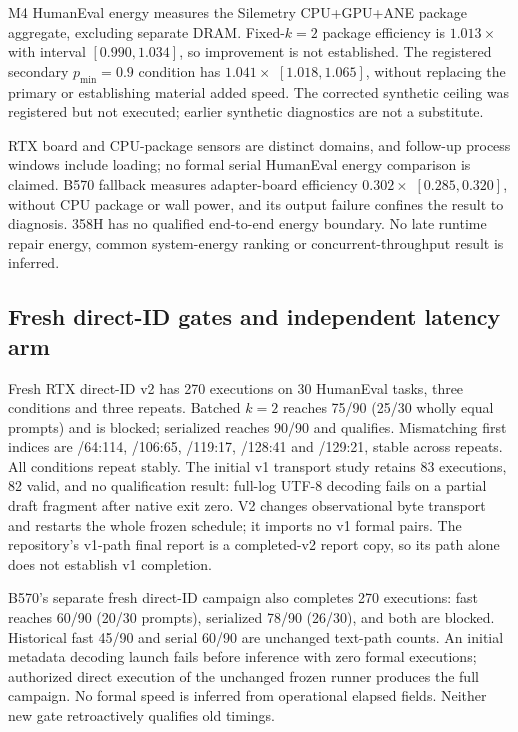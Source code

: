 M4 HumanEval energy measures the Silemetry CPU+GPU+ANE package aggregate, excluding separate DRAM. Fixed-$k=2$ package efficiency is $1.013\times$ with interval $[0.990,1.034]$, so improvement is not established. The registered secondary $p_{\min}=0.9$ condition has $1.041\times$ $[1.018,1.065]$, without replacing the primary or establishing material added speed. The corrected synthetic ceiling was registered but not executed; earlier synthetic diagnostics are not a substitute.

RTX board and CPU-package sensors are distinct domains, and follow-up process windows include loading; no formal serial HumanEval energy comparison is claimed. B570 fallback measures adapter-board efficiency $0.302\times$ $[0.285,0.320]$, without CPU package or wall power, and its output failure confines the result to diagnosis. 358H has no qualified end-to-end energy boundary. No late runtime repair energy, common system-energy ranking or concurrent-throughput result is inferred.

\subsection{Fresh direct-ID gates and independent latency arm}
\label{supp:historical_id_gates}
Fresh RTX direct-ID v2 has 270 executions on 30 HumanEval tasks, three conditions and three repeats. Batched $k=2$ reaches 75/90 (25/30 wholly equal prompts) and is blocked; serialized reaches 90/90 and qualifies. Mismatching first indices are /64:114, /106:65, /119:17, /128:41 and /129:21, stable across repeats. All conditions repeat stably. The initial v1 transport study retains 83 executions, 82 valid, and no qualification result: full-log UTF-8 decoding fails on a partial draft fragment after native exit zero. V2 changes observational byte transport and restarts the whole frozen schedule; it imports no v1 formal pairs. The repository's v1-path final report is a completed-v2 report copy, so its path alone does not establish v1 completion.

B570's separate fresh direct-ID campaign also completes 270 executions: fast reaches 60/90 (20/30 prompts), serialized 78/90 (26/30), and both are blocked. Historical fast 45/90 and serial 60/90 are unchanged text-path counts. An initial metadata decoding launch fails before inference with zero formal executions; authorized direct execution of the unchanged frozen runner produces the full campaign. No formal speed is inferred from operational elapsed fields. Neither new gate retroactively qualifies old timings.

